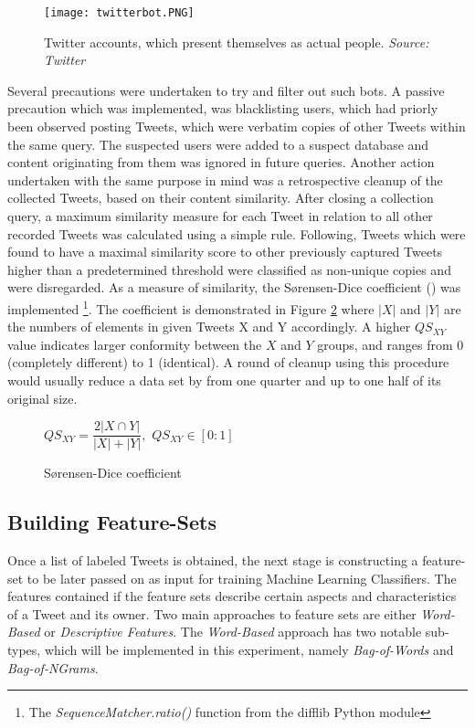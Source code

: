 			\begin{figure}[h]
				\centering
				\texttt{[image: twitterbot.PNG]}
				\captionsetup{width=0.8\textwidth}
				\caption[Fake Twitter Accounts]{Twitter accounts, which present themselves as actual people. \textit{Source: Twitter}}
				\label{fig:twitterbot}	
			\end{figure}
		
			\noindent
			Several precautions were undertaken to try and filter out such bots. A passive precaution which was implemented, was blacklisting users, which had priorly been observed posting Tweets, which were verbatim copies of other Tweets within the same query. The suspected users were added to a suspect database and content originating from them was ignored in future queries. Another action undertaken with the same purpose in mind was a retrospective cleanup of the collected Tweets, based on their content similarity. After closing a collection query, a maximum similarity measure for each Tweet in relation to all other recorded Tweets was calculated using a simple rule. Following, Tweets which were found to have a maximal similarity score to other previously captured Tweets  higher than a predetermined threshold were classified as non-unique copies and were disregarded. As a measure of similarity, the S\o rensen-Dice coefficient (\cite{sorensen1948method}) was implemented \footnote{The \textit{SequenceMatcher.ratio()} function from the difflib Python module}. The coefficient is demonstrated in Figure \ref{fig:sorenson_dice} where $|X|$ and $|Y|$ are the numbers of elements in given Tweets X and Y accordingly. A higher $ QS_{XY} $ value indicates larger conformity between the $ X $ and $ Y $ groups, and ranges from 0 (completely different) to 1 (identical). A round of cleanup using this procedure would usually reduce a data set by from one quarter and up to one half of its original size.
			
			\begin{figure}[h]
				\begin{center}
					$QS_{XY} = \dfrac{2|X\cap Y|}{|X|+|Y|},$ \hspace{10pt}  $QS_{XY} \in [0:1]$
				\end{center}
				\caption{S\o rensen-Dice coefficient}
				\label{fig:sorenson_dice}
			\end{figure}
		
	\subsection{Building Feature-Sets}
	\label{build_features}
		Once a list of labeled Tweets is obtained, the next stage is constructing a feature-set to be later passed on as input for training Machine Learning Classifiers. The features contained if the feature sets describe certain aspects and characteristics of a Tweet and its owner. Two main approaches to feature sets are either \textit{Word-Based} or \textit{Descriptive Features}. The \textit{Word-Based} approach has two notable sub-types, which will be implemented in this experiment, namely \textit{Bag-of-Words} and \textit{Bag-of-NGrams}.
	
